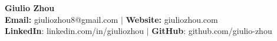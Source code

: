 \documentclass{article}
\begin{document}
\newcommand{\HRule}{\rule{\linewidth}{0.2mm}}


\begin{center}
\textbf{{\LARGE Giulio Zhou}} \\ 
\textbf{\fontsize{11}{13.2} Email:} giuliozhou8@gmail.com  $|$ \textbf{Website:} giuliozhou.com\\
\textbf{LinkedIn}: linkedin.com/in/giuliozhou $|$ \textbf{GitHub}: github.com/giulio-zhou\\[2mm]
\end{center}

\end{document}

